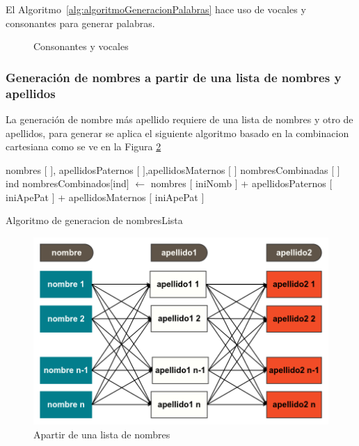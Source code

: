 El Algoritmo~\ref{alg:algoritmoGeneracionPalabras} hace uso de vocales y consonantes para generar palabras.
\begin{figure}[H]
\centering
{}
\caption{Consonantes y vocales} \label{fig:consonantes y vocales}
\end{figure}
\subsubsection{Generaci\'on de nombres a partir de una lista de nombres y apellidos}
La generaci\'on de nombre m\'as apellido requiere de una lista de nombres y otro de apellidos, para generar se aplica el siguiente algoritmo basado en la combinacion cartesiana como se ve en la Figura  \ref{fig:listNameLastName}
\begin{algorithm}[H]
\begin{algorithmic}[1]
\REQUIRE nombres $[$ $]$, apellidosPaternos $[$ $]$,apellidosMaternos $[$ $]$ \label{lin:NombresApellido1Apellido2}
\STATE nombresCombinadas $[$ $]$
\STATE ind
\STATE nombresCombinados$[$ind$]$ $\leftarrow$ nombres $[$ iniNomb $]$ + apellidosPaternos $[$ iniApePat $]$ + apellidosMaternos $[$ iniApePat $]$
\ENDFOR
\ENDFOR 
\ENDFOR
\RETURN \TRUE
\end{algorithmic}
\caption{Algoritmo de generacion de nombresLista}\label{alg:algoritmoRaro}
\end{algorithm}

\begin{figure}[H]
\centering
\includegraphics[scale=0.4]{images/listNameApe1Ape2.png}
\caption{Apartir de una lista de nombres}\label{fig:listNameLastName}
\end{figure}

